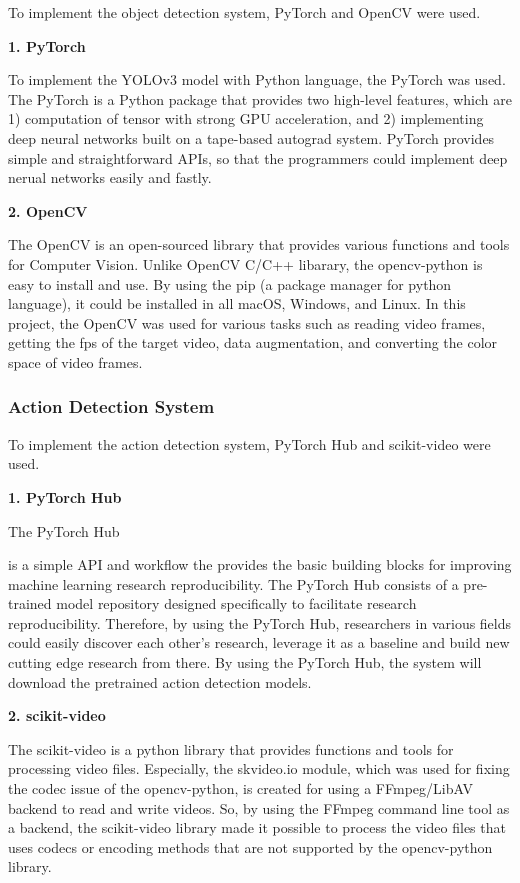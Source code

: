 \documentclass{article}
\begin{document}
To implement the object detection system, PyTorch and OpenCV were used.

\textbf{1. PyTorch}

To implement the YOLOv3 model with Python language, the PyTorch was used. The PyTorch is a Python package that provides two high-level features, which are 1) computation of tensor with strong GPU acceleration, and 2) implementing deep neural networks built on a tape-based autograd system. PyTorch provides simple and straightforward APIs, so that the programmers could implement deep nerual networks easily and fastly.

\textbf{2. OpenCV}

The OpenCV is an open-sourced library that provides various functions and tools for Computer Vision. Unlike OpenCV C/C++ libarary, the opencv-python is easy to install and use. By using the pip (a package manager for python language), it could be installed in all macOS, Windows, and Linux. In this project, the OpenCV was used for various tasks such as reading video frames, getting the fps of the target video, data augmentation, and converting the color space of video frames.

\subsubsection{Action Detection System}

To implement the action detection system, PyTorch Hub and scikit-video were used.

\textbf{1. PyTorch Hub}

\hypertarget{actionDetection_used}{The PyTorch Hub} is a simple API and workflow the provides the basic building blocks for improving machine learning research reproducibility. The PyTorch Hub consists of a pre-trained model repository designed specifically to facilitate research reproducibility.  Therefore, by using the PyTorch Hub, researchers in various fields could easily discover each other’s research, leverage it as a baseline and build new cutting edge research from there. By using the PyTorch Hub, the system will download the pretrained action detection models.

\textbf{2. scikit-video}

The scikit-video is a python library that provides functions and tools for processing video files. Especially, the skvideo.io module, which was used for fixing the codec issue of the opencv-python, is created for using a FFmpeg/LibAV backend to read and write videos. So, by using the FFmpeg command line tool as a backend, the scikit-video library made it possible to process the video files that uses codecs or encoding methods that are not supported by the opencv-python library.
\end{document}
